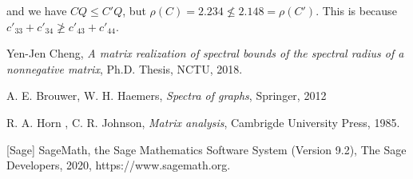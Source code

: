 \documentclass[12pt, a4paper]{article}
\theoremstyle{plain}
\theoremstyle{definition}
\begin{document}
    and we have $CQ\leq C'Q$, but
    $\rho(C)=2.234\not\leq 2.148= \rho(C')$.
    This is because $c'_{33}+c'_{34}\not\geq c'_{43}+c'_{44}$.




\begin{thebibliography}{20}
\normalsize
{}

Yen-Jen Cheng, {\it  A matrix realization of spectral bounds
of the spectral radius of a nonnegative matrix}, Ph.D. Thesis, NCTU, 2018.

A. E. Brouwer, W. H. Haemers, {\it Spectra of graphs}, Springer, 2012

R. A. Horn , C. R. Johnson, {\it Matrix analysis}, Cambrigde University Press, 1985.

[Sage] SageMath, the Sage Mathematics Software System (Version 9.2),
       The Sage Developers, 2020, https://www.sagemath.org.  %

\end{thebibliography}
\end{document}
